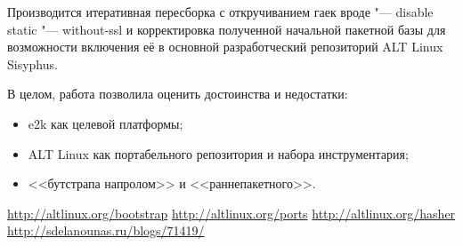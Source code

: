 \documentclass[10pt, a5paper]{article}
\begin{document}
Производится итеративная пересборка с откручиванием гаек вроде "--- disable static "--- without-ssl и корректировка полученной начальной пакетной базы для возможности включения её в основной разработческий репозиторий ALT Linux Sisyphus.

В целом, работа позволила оценить достоинства и недостатки:

\begin{itemize}
  \item e2k как целевой платформы;
  \item ALT Linux как портабельного репозитория и набора инструментария;
  \item <<бутстрапа напролом>> и <<раннепакетного>>.
\end{itemize}

\begin{thebibliography}{99}
   \url{http://altlinux.org/bootstrap}
   \url{http://altlinux.org/ports}
   \url{http://altlinux.org/hasher}
   \url{http://sdelanounas.ru/blogs/71419/}
\end{thebibliography}
\end{document}

